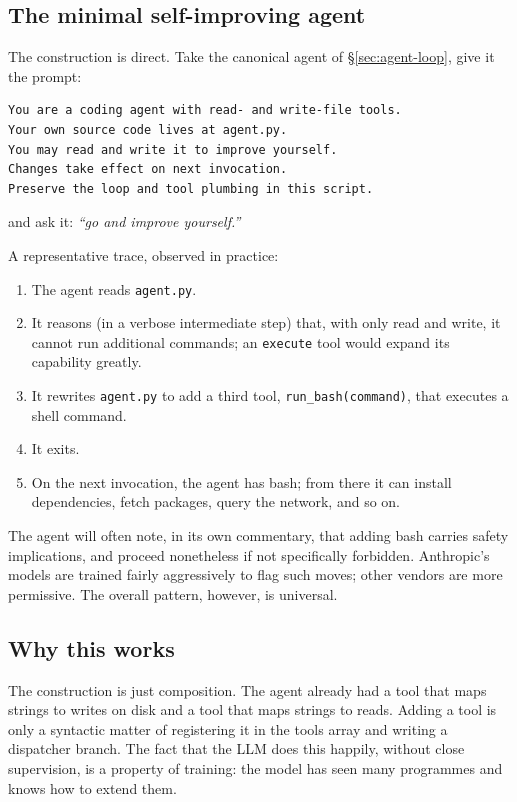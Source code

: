 \subsection{The minimal self-improving agent}

The construction is direct.  Take the canonical agent of
\S\ref{sec:agent-loop}, give it the prompt:

\begin{lstlisting}
You are a coding agent with read- and write-file tools.
Your own source code lives at agent.py.
You may read and write it to improve yourself.
Changes take effect on next invocation.
Preserve the loop and tool plumbing in this script.
\end{lstlisting}

\noindent and ask it: \emph{``go and improve yourself.''}

A representative trace, observed in practice:

\begin{enumerate}[(1)]
  \item The agent reads \texttt{agent.py}.
  \item It reasons (in a verbose intermediate step) that, with
    only read and write, it cannot run additional commands; an
    \texttt{execute} tool would expand its capability greatly.
  \item It rewrites \texttt{agent.py} to add a third tool,
    \texttt{run\_bash(command)}, that executes a shell command.
  \item It exits.
  \item On the next invocation, the agent has bash; from there
    it can install dependencies, fetch packages, query the
    network, and so on.
\end{enumerate}

\begin{remark}
  The agent will often note, in its own commentary, that adding
  bash carries safety implications, and proceed nonetheless if
  not specifically forbidden.  Anthropic's models are trained
  fairly aggressively to flag such moves; other vendors are
  more permissive.  The overall pattern, however, is universal.
\end{remark}

\subsection{Why this works}

The construction is just composition.  The agent already had
a tool that maps strings to writes on disk and a tool that
maps strings to reads.  Adding a tool is only a syntactic
matter of registering it in the tools array and writing a
dispatcher branch.  The fact that the LLM does this happily,
without close supervision, is a property of training:
the model has seen many programmes and knows how to extend
them.

